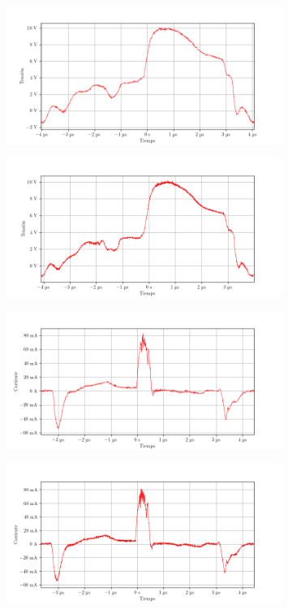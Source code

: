 \begin{figure}[ht]
    \centering
    \includegraphics[width=0.8\textwidth]{images/capturas-osciloscopio/17-11-2022/13.png}
    \caption{}
    \label{fig:osc:13}
\end{figure}

\begin{figure}[ht]
    \centering
    \includegraphics[width=0.8\textwidth]{images/capturas-osciloscopio/17-11-2022/14.png}
    \caption{}
    \label{fig:osc:14}
\end{figure}

\begin{figure}[ht]
    \centering
    \includegraphics[width=0.8\textwidth]{images/capturas-osciloscopio/17-11-2022/15.png}
    \caption{}
    \label{fig:osc:15}
\end{figure}

\begin{figure}[ht]
    \centering
    \includegraphics[width=0.8\textwidth]{images/capturas-osciloscopio/17-11-2022/16.png}
    \caption{}
    \label{fig:osc:16}
\end{figure}

